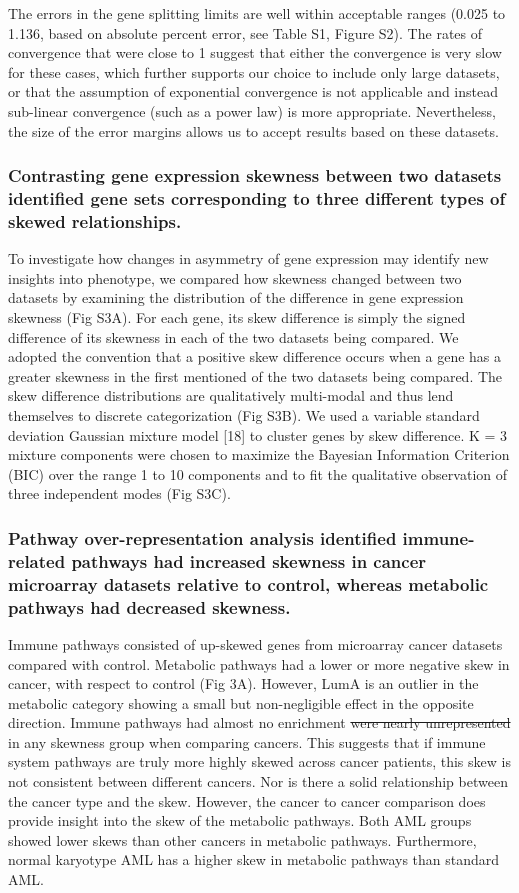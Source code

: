 \documentclass[11pt]{article}
\newcommand{\sr}[1]{{\color{red} \st{#1} }}
\newcommand{\rd}[1]{{\color{red}#1}}
\begin{document}
The errors in the gene splitting limits are well within acceptable ranges (0.025 to 1.136, based on absolute \rd{percent} error, see Table S1, Figure S2). The rates of convergence that were close to 1 suggest that either the convergence is very slow for these cases, which further supports our choice to include only large datasets, or that the assumption of exponential convergence is not applicable and instead sub-linear convergence (such as a power law) is more appropriate. Nevertheless, the size of the error margins allows us to accept results based on these datasets.

\subsubsection*{Contrasting gene expression skewness between two datasets identified gene sets corresponding to three different types of skewed relationships.}

To investigate how changes in asymmetry of gene expression may identify new insights into phenotype, we compared how skewness changed between two datasets by examining the distribution of the difference in gene expression skewness (Fig S3A). For each gene, its skew difference is simply the signed difference of its skewness in each of the two datasets being compared. We adopted the convention that a positive skew difference occurs when a gene has a greater skewness in the first mentioned of the two datasets being compared. The skew difference distributions are qualitatively multi-modal and thus lend themselves to discrete categorization (Fig S3B). We used a variable standard deviation Gaussian mixture model [18] to cluster genes by skew difference. K = 3 mixture components were chosen to maximize the Bayesian Information Criterion (BIC) over the range 1 to 10 components and to fit the qualitative observation of three independent modes (Fig S3C).

\subsubsection*{Pathway over-representation analysis identified immune-related pathways had increased skewness in cancer microarray datasets relative to control, whereas metabolic pathways had decreased skewness. }

Immune pathways consisted of up-skewed genes from microarray cancer datasets compared with control. Metabolic pathways had a lower or more negative skew in cancer, with respect to control (Fig 3A). However, LumA is an outlier in the metabolic category showing a small but non-negligible effect in the opposite direction. Immune pathways \rd{had almost no enrichment} \sr{were nearly unrepresented} in any skewness group when comparing cancers. This suggests that if immune system pathways are truly more highly skewed across cancer patients, this skew is not consistent between different cancers. Nor is there a solid relationship between the cancer type and the skew. However, the cancer to cancer comparison does provide insight into the skew of the metabolic pathways. Both AML groups showed lower skews than other cancers in metabolic pathways. Furthermore, normal karyotype AML has a higher skew in metabolic pathways than standard AML. 
\end{document}
